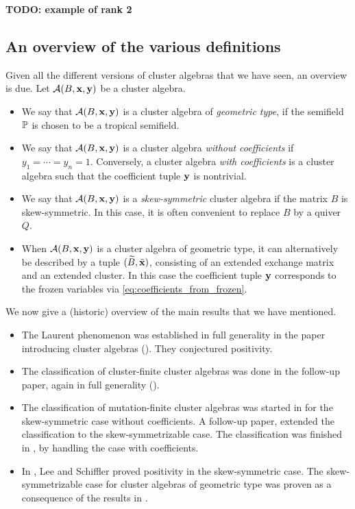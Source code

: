 \textbf{TODO: example of rank 2}

\subsection{An overview of the various definitions}

Given all the different versions of cluster algebras that we have seen, an overview is
due. Let $\mathcal{A}(B, \mathbf{x}, \mathbf{y})$ be a cluster algebra.
\begin{itemize}
	\item We say that $\mathcal{A}(B, \mathbf{x}, \mathbf{y})$ is a cluster algebra of \emph{geometric
		      type}, if the semifield $\mathbb{P}$ is chosen to be
	      a tropical semifield.
	\item We say that $\mathcal{A}(B, \mathbf{x}, \mathbf{y})$ is a cluster algebra \emph{without
		      coefficients} if $y_1 = \cdots = y_n = 1$.
	      Conversely, a cluster algebra \emph{with coefficients} is a cluster algebra such that the coefficient tuple $\mathbf{y}$ is nontrivial.
	\item We say that $\mathcal{A}(B, \mathbf{x}, \mathbf{y})$ is a \emph{skew-symmetric} cluster
	      algebra if the matrix $B$ is skew-symmetric. In
	      this case, it is often convenient to replace $B$ by a quiver $Q$.
	\item When $\mathcal{A}(B, \mathbf{x}, \mathbf{y})$ is a cluster algebra of geometric type, it can alternatively
	      be described by a tuple $(\widetilde{B}, \tilde{\mathbf{x}})$, consisting of an extended exchange matrix and an
	      extended cluster. In this case the coefficient tuple $\mathbf{y}$ corresponds to the frozen
	      variables via \cref{eq:coefficients_from_frozen}.
\end{itemize}

We now give a (historic) overview of the main results that we have mentioned.
\begin{itemize}
	\item The Laurent phenomenon was established in full generality in the paper introducing
	      cluster algebras (\cite[Theorem 3.1]{FominZelevinsky2002CAF}). They conjectured
	      positivity.
	\item The classification of cluster-finite cluster algebras was done in the follow-up paper,
	      again in full generality (\cite{FominZelevinsky2003CAFin}).
	\item The classification of mutation-finite cluster algebras was started in
	      \cite{FeliksonShapiroTumarkin2012SkewSCA} for the skew-symmetric case without
	      coefficients. A follow-up paper, extended the classification to the skew-symmetrizable
	      case. The classification was finished in \cite{FeliksonPavel2023cluster}, by handling
	      the case with coefficients.
	\item In \cite{LeeSchiffler2015PositivityCA}, Lee and Schiffler proved positivity in the
	      skew-symmetric case. The skew-symmetrizable case for cluster algebras of geometric type
	      was proven as a consequence of the results in
	      \cite{GrossHackingKeelKontsevich2018CanonicalBCA}.
\end{itemize}

